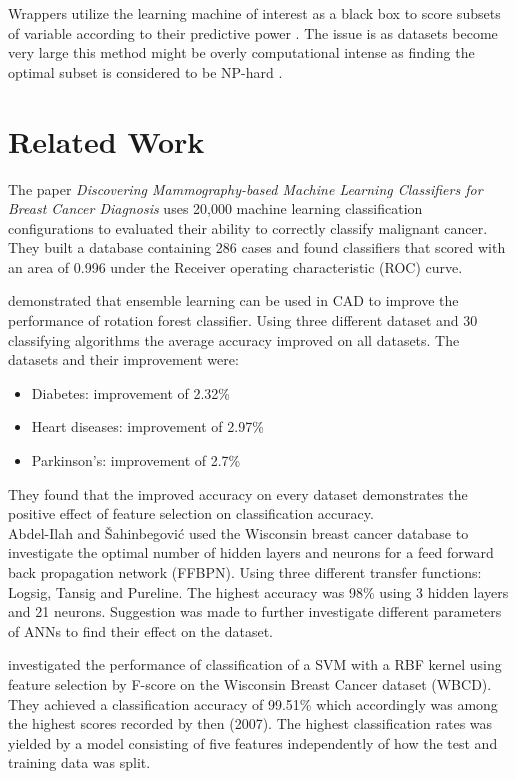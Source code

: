\documentclass{kththesis}
\begin{document}
Wrappers utilize the learning machine of interest as a black box to score subsets of variable according to their predictive power \parencite{guyon2003}. The issue is as datasets become very large this method might be overly computational intense as finding the optimal subset is considered to be NP-hard \parencite{amaldi1998}.

\section{Related Work}

The paper \textit{Discovering Mammography-based Machine Learning Classifiers for Breast Cancer Diagnosis} \parencite{ramos2012} uses 20,000 machine learning classification configurations to evaluated their ability to correctly classify malignant cancer. They built a database containing 286 cases and found classifiers that scored with an area of 0.996 under the Receiver operating characteristic (ROC) curve.



\textcite{akin2011} demonstrated that ensemble learning can be used in CAD to improve the performance of rotation forest classifier. Using three different dataset and 30 classifying algorithms the average accuracy improved on all datasets. The datasets and their improvement were:

\begin{itemize}
  \item Diabetes: improvement of 2.32\%
  \item Heart diseases: improvement of 2.97\%
  \item Parkinson's: improvement of 2.7\%
\end{itemize}

They found that the improved accuracy on every dataset demonstrates the positive effect of feature selection on classification accuracy.\\

Abdel-Ilah and {\v{S}}ahinbegovi{\'{c}} \parencite{Abdel-Ilah2017} used the Wisconsin breast cancer database to investigate the optimal number of hidden layers and neurons for a feed forward back propagation network (FFBPN). Using three different transfer functions: Logsig, Tansig and Pureline. The highest accuracy was 98\% using 3 hidden layers and 21 neurons. Suggestion was made to further investigate different parameters of ANNs to find their effect on the dataset.

\textcite{akay2009} investigated the performance of classification of a SVM with a RBF kernel using feature selection by F-score on the Wisconsin Breast Cancer dataset (WBCD). They achieved a classification accuracy of 99.51\% which accordingly was among the highest scores recorded by then (2007). The highest classification rates was yielded by a model consisting of five features independently of how the test and training data was split. \\
\end{document}
